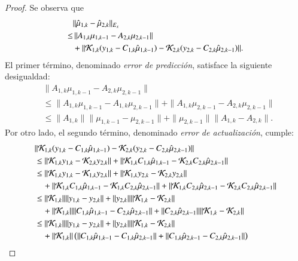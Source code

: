 \begin{proof}
Se observa que  
\begin{equation*}
	\begin{aligned}
		&	\| \hat \mu_{1,k} - \hat \mu_{2,k} \|_{E_x}  \\
		\leq & \, \| A_{1,k} \mu_{1,k-1}  - A_{2,k} \mu_{2,k-1} \|  \\
		& + \|  \mathcal{K}_{1,k} (y_{1,k} - C_{1,k} \hat\mu_{1,k-1}) -  \mathcal{K}_{2,k} (y_{2,k} - C_{2,k} \hat\mu_{2,k-1})  \|.
	\end{aligned}
\end{equation*}
El primer término, denominado \textit{error de predicción}, satisface la siguiente desigualdad:
\begin{equation*}
	\begin{aligned}
		& \| A_{1,k} \mu_{1,k-1}  - A_{2,k} \mu_{2,k-1} \|  \\
		& \leq \| A_{1,k} \mu_{1,k-1}  - A_{1,k} \mu_{2,k-1} \| + \| A_{1,k} \mu_{2,k-1}  - A_{2,k} \mu_{2,k-1} \| \\
		& \leq \| A_{1,k} \| \| \mu_{1,k-1}  - \mu_{2,k-1} \| +  \| \mu_{2,k-1} \| \| A_{1,k} - A_{2,k} \|.
	\end{aligned}
\end{equation*}
Por otro lado, el segundo término, denominado \textit{error de actualización}, cumple:
\begingroup
\allowdisplaybreaks
\begin{align*}
    & \|  \K_{1,k} (y_{1,k} - C_{1,k} \hat\mu_{1,k-1}) -  \K_{2,k} (y_{2,k} - C_{2,k} \hat\mu_{2,k-1})  \| \\
		& \leq  \| \K_{1,k} y_{1,k} -  \K_{2,k} y_{2,k}  \| + \| \K_{1,k} C_{1,k} \hat\mu_{1,k-1} - \K_{2,k} C_{2,k} \hat\mu_{2,k-1}  \| \\
		& \leq \| \K_{1,k} y_{1,k} -  \K_{1,k} y_{2,k}  \| + \| \K_{1,k} y_{2,k} -  \K_{2,k} y_{2,k}  \| \\
		& \quad + \| \K_{1,k} C_{1,k} \hat\mu_{1,k-1} - \K_{1,k} C_{2,k} \hat\mu_{2,k-1}  \| + \| \K_{1,k} C_{2,k} \hat\mu_{2,k-1} - \K_{2,k} C_{2,k} \hat\mu_{2,k-1}  \| \\
		& \leq \| \K_{1,k} \| \|  y_{1,k} - y_{2,k}  \| + \| y_{2,k} \| \| \K_{1,k}  -  \K_{2,k}  \| \\
		& \quad + \| \K_{1,k} \| \|  C_{1,k} \hat\mu_{1,k-1} - C_{2,k} \hat\mu_{2,k-1}  \| + \| C_{2,k} \hat\mu_{2,k-1} \| \| \K_{1,k}  - \K_{2,k} \| \\
		& \leq \| \K_{1,k} \| \|  y_{1,k} - y_{2,k}  \| + \| y_{2,k} \| \| \K_{1,k}  -  \K_{2,k}  \| \\
		& \quad + \| \K_{1,k} \| \left ( \|  C_{1,k} \hat\mu_{1,k-1} - C_{1,k} \hat\mu_{2,k-1}  \| + \|  C_{1,k} \hat\mu_{2,k-1} - C_{2,k} \hat\mu_{2,k-1}  \| \right ) \\

\end{align*}
\end{proof}
